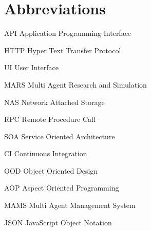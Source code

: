     \newcommand{\abbrlabel}[1]{\makebox[3cm][l]{\textbf{#1}\ }}
\newenvironment{abbreviations}{\begin{list}{}{\renewcommand{\makelabel}{\abbrlabel}}}{\end{list}}
%

\newpage
\chapter*{Abbreviations}
\begin{abbreviations}
\item[API] Application Programming Interface
\item[HTTP] Hyper Text Transfer Protocol
\item[UI] User Interface
\item[MARS] Multi Agent Research and Simulation
\item[NAS] Network Attached Storage
\item[RPC] Remote Procedure Call
\item[SOA] Service Oriented Architecture
\item[CI] Continuous Integration
\item[OOD] Object Oriented Design
\item[AOP] Aspect Oriented Programming
\item[MAMS] Multi Agent Management System
\item[JSON] JavaScript Object Notation
\end{abbreviations}
%